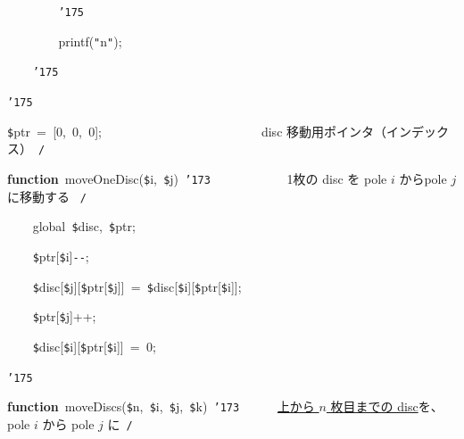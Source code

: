 \documentclass[a4paper,10pt]{article}
\def\mc{\relax}
\begin{document}
\noindent
\mbox{}{\tt\mc \ }{\tt\mc \ }{\tt\mc \ }{\tt\mc \ }{\tt\mc \ }{\tt\mc \ }{\tt\mc \ }{\tt\mc \ }{\tt\char'175}

\noindent
\mbox{}{\tt\mc \ }{\tt\mc \ }{\tt\mc \ }{\tt\mc \ }{\tt\mc \ }{\tt\mc \ }{\tt\mc \ }{\tt\mc \ }printf({\tt "}{\tt{}}n{\tt "});

\noindent
\mbox{}{\tt\mc \ }{\tt\mc \ }{\tt\mc \ }{\tt\mc \ }{\tt\char'175}

\noindent
\mbox{}{\tt\char'175}

\noindent
\mbox{}\hfill

\noindent
\mbox{}{\tt\$}ptr{\tt\mc \ }={\tt\mc \ }[0,{\tt\mc \ }0,{\tt\mc \ }0];{\tt\mc \ }{\tt\mc \ }{\tt\mc \ }{\tt\mc \ }{\tt\mc \ }{\tt\mc \ }{\tt\mc \ }{\tt\mc \ }{\tt\mc \ }{\tt\mc \ }{\tt\mc \ }{\tt\mc \ }{\tt\mc \ }{\tt\mc \ }{\tt\mc \ }{\tt\mc \ }{\tt\mc \ }{\tt\mc \ }{\tt\mc \ }{\tt\mc \ }{\tt\mc \ }{\tt\mc \ }{\tt\mc \ }\rm\mc {\tt /}{\tt *}\  \ disc 移動用ポインタ（インデックス）\hfill \rm\mc \ {\tt *}{\tt /}
\tt\mc 

\noindent
\mbox{}\hfill

\noindent
\mbox{}\textbf{function}{\tt\mc \ }moveOneDisc({\tt\$}i,{\tt\mc \ }{\tt\$}j){\tt\mc \ }{\tt\char'173}{\tt\mc \ }{\tt\mc \ }{\tt\mc \ }{\tt\mc \ }{\tt\mc \ }{\tt\mc \ }{\tt\mc \ }{\tt\mc \ }{\tt\mc \ }{\tt\mc \ }\rm\mc {\tt /}{\tt *}\  \ 1枚の disc を pole $i$ からpole $j$ に移動する \hfill \rm\mc \ {\tt *}{\tt /}
\tt\mc 

\noindent
\mbox{}{\tt\mc \ }{\tt\mc \ }{\tt\mc \ }{\tt\mc \ }global{\tt\mc \ }{\tt\$}disc,{\tt\mc \ }{\tt\$}ptr;

\noindent
\mbox{}{\tt\mc \ }{\tt\mc \ }{\tt\mc \ }{\tt\mc \ }{\tt\$}ptr[{\tt\$}i]{\tt -}{\tt -};

\noindent
\mbox{}{\tt\mc \ }{\tt\mc \ }{\tt\mc \ }{\tt\mc \ }{\tt\$}disc[{\tt\$}j][{\tt\$}ptr[{\tt\$}j]]{\tt\mc \ }={\tt\mc \ }{\tt\$}disc[{\tt\$}i][{\tt\$}ptr[{\tt\$}i]];

\noindent
\mbox{}{\tt\mc \ }{\tt\mc \ }{\tt\mc \ }{\tt\mc \ }{\tt\$}ptr[{\tt\$}j]++;

\noindent
\mbox{}{\tt\mc \ }{\tt\mc \ }{\tt\mc \ }{\tt\mc \ }{\tt\$}disc[{\tt\$}i][{\tt\$}ptr[{\tt\$}i]]{\tt\mc \ }={\tt\mc \ }0;

\noindent
\mbox{}{\tt\char'175}

\noindent
\mbox{}\hfill

\noindent
\mbox{}\textbf{function}{\tt\mc \ }moveDiscs({\tt\$}n,{\tt\mc \ }{\tt\$}i,{\tt\mc \ }{\tt\$}j,{\tt\mc \ }{\tt\$}k){\tt\mc \ }{\tt\char'173}{\tt\mc \ }{\tt\mc \ }{\tt\mc \ }{\tt\mc \ }\rm\mc {\tt /}{\tt *}\  \ \underline{\textsf{上から $n$ 枚目までの disc}}を、pole $i$ から pole $j$ に\hfill \rm\mc \ {\tt *}{\tt /}
\tt\mc 
\end{document}

